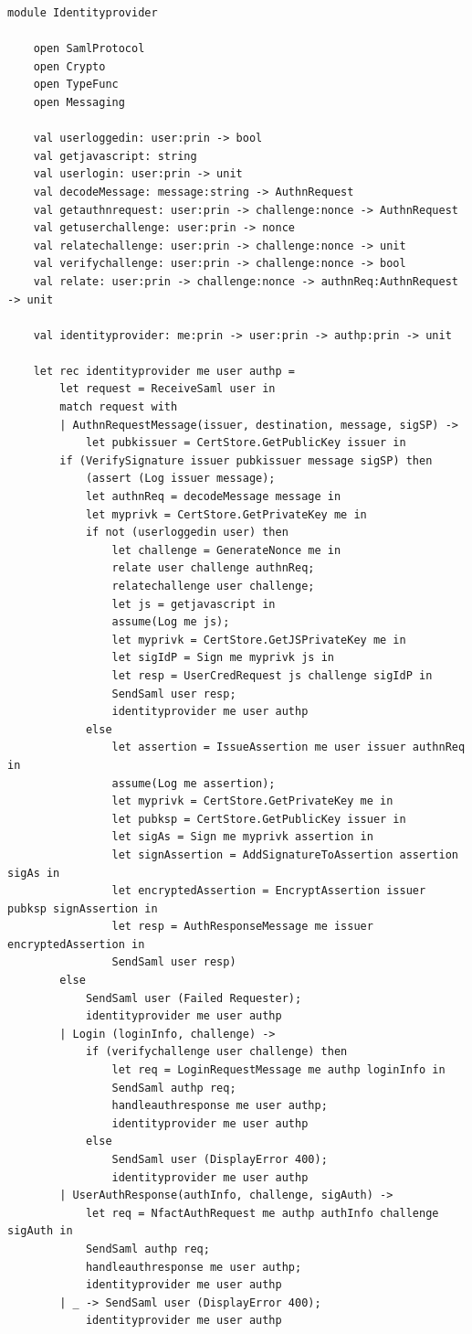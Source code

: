 \documentclass[twosided]{report}
\begin{document}
\begin{lstlisting}[style=fstar, caption={Handling and delegation of a user's requests}]
	module Identityprovider

	open SamlProtocol
	open Crypto
	open TypeFunc
	open Messaging

	val userloggedin: user:prin -> bool
	val getjavascript: string
	val userlogin: user:prin -> unit
	val decodeMessage: message:string -> AuthnRequest
	val getauthnrequest: user:prin -> challenge:nonce -> AuthnRequest
	val getuserchallenge: user:prin -> nonce
	val relatechallenge: user:prin -> challenge:nonce -> unit
	val verifychallenge: user:prin -> challenge:nonce -> bool
	val relate: user:prin -> challenge:nonce -> authnReq:AuthnRequest -> unit

	val identityprovider: me:prin -> user:prin -> authp:prin -> unit

	let rec identityprovider me user authp =
		let request = ReceiveSaml user in
		match request with
		| AuthnRequestMessage(issuer, destination, message, sigSP) ->
			let pubkissuer = CertStore.GetPublicKey issuer in
		if (VerifySignature issuer pubkissuer message sigSP) then
			(assert (Log issuer message);
			let authnReq = decodeMessage message in
			let myprivk = CertStore.GetPrivateKey me in
			if not (userloggedin user) then
				let challenge = GenerateNonce me in
				relate user challenge authnReq;
				relatechallenge user challenge;
				let js = getjavascript in
				assume(Log me js);
				let myprivk = CertStore.GetJSPrivateKey me in
				let sigIdP = Sign me myprivk js in
				let resp = UserCredRequest js challenge sigIdP in
				SendSaml user resp;
				identityprovider me user authp
			else
				let assertion = IssueAssertion me user issuer authnReq in
				assume(Log me assertion);
				let myprivk = CertStore.GetPrivateKey me in
				let pubksp = CertStore.GetPublicKey issuer in
				let sigAs = Sign me myprivk assertion in
				let signAssertion = AddSignatureToAssertion assertion sigAs in
				let encryptedAssertion = EncryptAssertion issuer pubksp signAssertion in
				let resp = AuthResponseMessage me issuer encryptedAssertion in
				SendSaml user resp)
		else
			SendSaml user (Failed Requester);
			identityprovider me user authp
		| Login (loginInfo, challenge) ->
			if (verifychallenge user challenge) then
				let req = LoginRequestMessage me authp loginInfo in
				SendSaml authp req;
				handleauthresponse me user authp;
				identityprovider me user authp
			else
				SendSaml user (DisplayError 400);
				identityprovider me user authp
		| UserAuthResponse(authInfo, challenge, sigAuth) ->
			let req = NfactAuthRequest me authp authInfo challenge sigAuth in
			SendSaml authp req;
			handleauthresponse me user authp;
			identityprovider me user authp
		| _ -> SendSaml user (DisplayError 400);
			identityprovider me user authp
\end{lstlisting}
\end{document}
